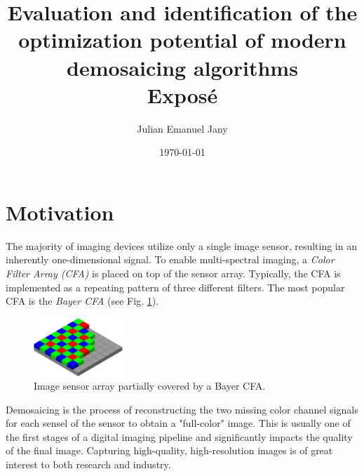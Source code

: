 \documentclass[english,notitlepage,smartquotes]{hgbreport}
\author{Julian Emanuel Jany}                     %
\title{Evaluation and identification of the optimization potential of modern demosaicing algorithms \\ %
			 \textbf{Exposé}}
\date{\today}
\begin{document}
\maketitle



\section{Motivation}

The majority of imaging devices utilize only a single image sensor, resulting in an inherently one-dimensional signal. To enable multi-spectral imaging, a \emph{Color Filter Array (CFA)} is placed on top of the sensor array. Typically, the CFA is implemented as a repeating pattern of three different filters. The most popular CFA is the \emph{Bayer CFA} (see Fig. \ref{fig:bayer_cfa}).

\begin{figure}[]
	\centering
	\includegraphics[width=0.3\textwidth]{bayer_pattern}
\caption{Image sensor array partially covered by a Bayer CFA. \cite{BayerCFA}}
\label{fig:bayer_cfa}
\end{figure}

Demosaicing is the process of reconstructing the two missing color channel signals for each sensel of the sensor to obtain a "full-color" image. This is usually one of the first stages of a digital imaging pipeline and significantly impacts the quality of the final image. Capturing high-quality, high-resolution images is of great interest to both research and industry. %
\end{document}
